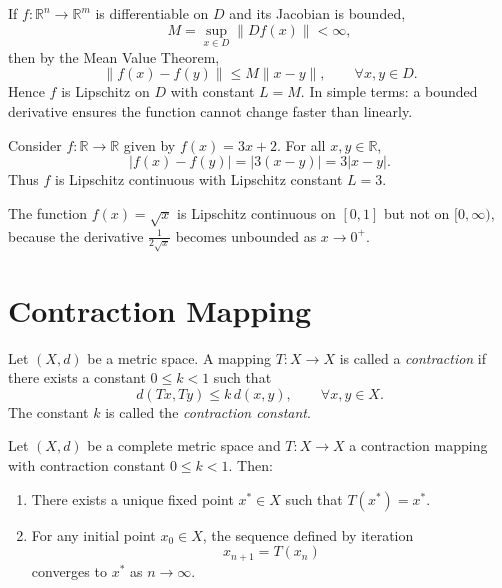 \begin{remark}
    If $f:\mathbb{R}^n \to \mathbb{R}^m$ is differentiable on $D$ and its Jacobian is bounded,
    \[
        M = \sup_{x \in D} \|Df(x)\| < \infty,
    \]
    then by the Mean Value Theorem,
    \[
        \|f(x)-f(y)\| \leq M \|x-y\|, \qquad \forall x,y \in D.
    \]
    Hence $f$ is Lipschitz on $D$ with constant $L=M$.  
    In simple terms: a bounded derivative ensures the function cannot change faster than linearly.
\end{remark}


\begin{example}
    Consider $f:\mathbb{R}\to \mathbb{R}$ given by $f(x) = 3x + 2$.  
    For all $x,y \in \mathbb{R}$,
    \[
        |f(x)-f(y)| = |3(x-y)| = 3|x-y|.
    \]
    Thus $f$ is Lipschitz continuous with Lipschitz constant $L=3$.
\end{example}

\begin{example}
    The function $f(x) = \sqrt{x}$ is Lipschitz continuous on $[0,1]$ but not on $[0,\infty)$, because the derivative $\frac{1}{2\sqrt{x}}$ becomes unbounded as $x \to 0^+$.
\end{example}

\section{Contraction Mapping}

\begin{definition}
    Let $(X,d)$ be a metric space.  
    A mapping $T: X \to X$ is called a \emph{contraction} if there exists a constant $0 \leq k < 1$ such that
    \[
        d(Tx,Ty) \leq k \, d(x,y), \qquad \forall x,y \in X.
    \]
    The constant $k$ is called the \emph{contraction constant}.
\end{definition}


\begin{theorem}
    Let $(X,d)$ be a complete metric space and $T:X \to X$ a contraction mapping with contraction constant $0 \leq k < 1$.  
    Then:
    \begin{enumerate}
        \item There exists a unique fixed point $x^* \in X$ such that $T(x^*) = x^*$.
        \item For any initial point $x_0 \in X$, the sequence defined by iteration
        \[
            x_{n+1} = T(x_n)
        \]
        converges to $x^*$ as $n \to \infty$.
    \end{enumerate}
\end{theorem}

